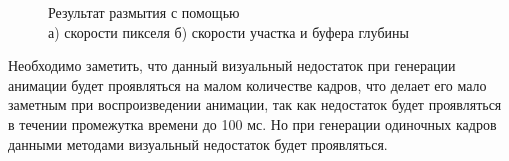 \begin{figure}[H]
    \centering
    \begin{minipage}[h]{0.45\linewidth}
    \end{minipage}
    \hfill
    \begin{minipage}[h]{0.45\linewidth}
    \end{minipage}
    

    \caption{Результат размытия с помощью  \\ а) скорости пикселя б) скорости участка и буфера глубины}
    \label{fig:exp_art_2}
\end{figure} 


Необходимо заметить, что данный визуальный недостаток при генерации анимации будет проявляться на малом количестве кадров, что делает его мало заметным при воспроизведении анимации, так как недостаток будет проявляться в течении промежутка времени до 100 мс. Но при генерации одиночных кадров данными методами визуальный недостаток будет проявляться.  


